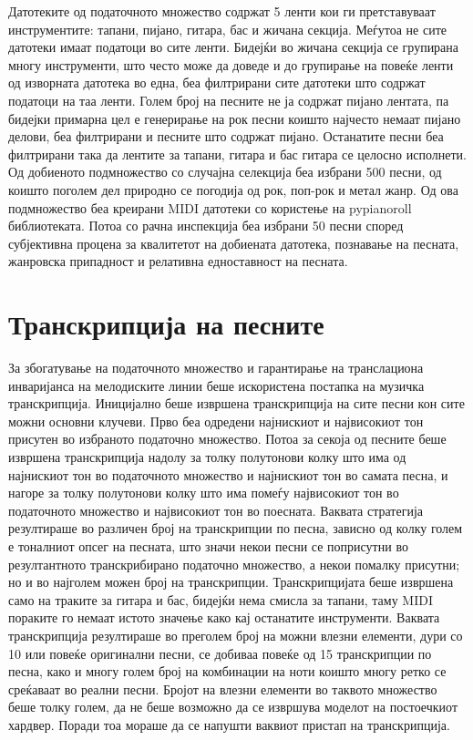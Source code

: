 Датотеките од податочното множество содржат 5 ленти кои ги претставуваат инструментите: тапани, пијано, гитара, бас и жичана секција. Меѓутоа не сите датотеки имаат податоци во сите ленти. Бидејќи во жичана секција се групирана многу инструменти, што често може да доведе и до групирање на повеќе ленти од изворната датотека во една, беа филтрирани сите датотеки што содржат податоци на таа ленти. Голем број на песните не ја содржат пијано лентата, па бидејки примарна цел е генерирање на рок песни коишто најчесто немаат пијано делови, беа филтрирани и песните што содржат пијано. Останатите песни беа филтрирани така да лентите за тапани, гитара и бас гитара се целосно исполнети. Од добиеното подмножество со случајна селекција беа избрани 500 песни, од коишто поголем дел природно се погодија од рок, поп-рок и метал жанр. Од ова подмножество беа креирани MIDI датотеки со користење на pypianoroll библиотеката. Потоа со рачна инспекција беа избрани 50 песни според субјективна процена за квалитетот на добиената датотека, познавање на песната, жанровска припадност и релативна едноставност на песната.

\section{Транскрипција на песните}

За збогатување на податочното множество и гарантирање на транслациона инваријанса на мелодиските линии беше искористена постапка на музичка транскрипција. Иницијално беше извршена транскрипција на сите песни кон сите можни основни клучеви. Прво беа одредени најнискиот и највисокиот тон присутен во избраното податочно множество. Потоа за секоја од песните беше извршена транскрипција надолу за толку полутонови колку што има од најнискиот тон во податочното множество и најнискиот тон во самата песна, и нагоре за толку полутонови колку што има помеѓу највисокиот тон во податочното множество и највисокиот тон во поесната. Ваквата стратегија резултираше во различен број на транскрипции по песна, зависно од колку голем е тоналниот опсег на песната, што значи некои песни се поприсутни во резултантното транскрибирано податочно множество, а некои помалку присутни; но и во најголем можен број на транскрипции. Транскрипцијата беше извршена само на траките за гитара и бас, бидејќи нема смисла за тапани, таму MIDI пораките го немаат истото значење како кај останатите инструменти. Ваквата транскрипција резултираше во преголем број на можни влезни елементи, дури со 10 или повеќе оригинални песни, се добиваа повеќе од 15 транскрипции по песна, како и многу голем број на комбинации на ноти коишто многу ретко се среќаваат во реални песни. Бројот на влезни елементи во таквото множество беше толку голем, да не беше возможно да се извршува моделот на постоечкиот хардвер. Поради тоа мораше да се напушти ваквиот пристап на транскрипција. 

